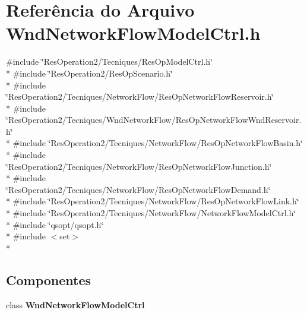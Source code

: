 \section{Referência do Arquivo Wnd\+Network\+Flow\+Model\+Ctrl.\+h}
\label{_wnd_network_flow_model_ctrl_8h}
{\ttfamily \#include \char`\"{}Res\+Operation2/\+Tecniques/\+Res\+Op\+Model\+Ctrl.\+h\char`\"{}}\\*
{\ttfamily \#include \char`\"{}Res\+Operation2/\+Res\+Op\+Scenario.\+h\char`\"{}}\\*
{\ttfamily \#include \char`\"{}Res\+Operation2/\+Tecniques/\+Network\+Flow/\+Res\+Op\+Network\+Flow\+Reservoir.\+h\char`\"{}}\\*
{\ttfamily \#include \char`\"{}Res\+Operation2/\+Tecniques/\+Wnd\+Network\+Flow/\+Res\+Op\+Network\+Flow\+Wnd\+Reservoir.\+h\char`\"{}}\\*
{\ttfamily \#include \char`\"{}Res\+Operation2/\+Tecniques/\+Network\+Flow/\+Res\+Op\+Network\+Flow\+Basin.\+h\char`\"{}}\\*
{\ttfamily \#include \char`\"{}Res\+Operation2/\+Tecniques/\+Network\+Flow/\+Res\+Op\+Network\+Flow\+Junction.\+h\char`\"{}}\\*
{\ttfamily \#include \char`\"{}Res\+Operation2/\+Tecniques/\+Network\+Flow/\+Res\+Op\+Network\+Flow\+Demand.\+h\char`\"{}}\\*
{\ttfamily \#include \char`\"{}Res\+Operation2/\+Tecniques/\+Network\+Flow/\+Res\+Op\+Network\+Flow\+Link.\+h\char`\"{}}\\*
{\ttfamily \#include \char`\"{}Res\+Operation2/\+Tecniques/\+Network\+Flow/\+Network\+Flow\+Model\+Ctrl.\+h\char`\"{}}\\*
{\ttfamily \#include \char`\"{}qsopt/qsopt.\+h\char`\"{}}\\*
{\ttfamily \#include $<$set$>$}\\*
\subsection*{Componentes}
\begin{DoxyCompactItemize}
\item 
class {\bf Wnd\+Network\+Flow\+Model\+Ctrl}
\end{DoxyCompactItemize}
